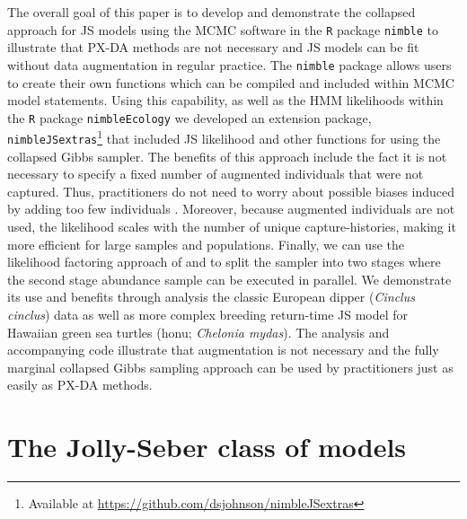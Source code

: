 \documentclass[12pt]{article}
\begin{document}
The overall goal of this paper is to develop and demonstrate the collapsed approach for JS models using the MCMC software in the {\tt R} package \verb|nimble| \citep{Valpine:2017vg} to illustrate that PX-DA methods are not necessary and JS models can be fit without data augmentation in regular practice. The \verb|nimble| package allows users to create their own functions which can be compiled and included within MCMC model statements. Using this capability, as well as the HMM likelihoods within the {\tt R} package {\tt nimbleEcology} \citep{GoldsteinEtAl2024a} we developed an extension package, {\tt nimbleJSextras}\footnote{Available at \url{https://github.com/dsjohnson/nimbleJSextras}} that included JS likelihood and other functions for using the collapsed Gibbs sampler. The benefits of this approach include the fact it is not necessary to specify a fixed number of augmented individuals that were not captured. Thus, practitioners do not need to worry about possible biases induced by adding too few individuals \citep{link2013cautionary}. Moreover, because augmented individuals are not used, the likelihood scales with the number of unique capture-histories, making it more efficient for large samples and populations. Finally, we can use the likelihood factoring approach of \cite{king2015capture} and \cite{Hooten:2023aa} to split the sampler into two stages where the second stage abundance sample can be executed in parallel. We demonstrate its use and benefits through analysis the classic European dipper ({\it Cinclus cinclus}) data as well as more complex breeding return-time JS model for Hawaiian green sea turtles (honu; {\it Chelonia mydas}). The analysis and accompanying code illustrate that augmentation is not necessary and the fully marginal collapsed Gibbs sampling approach can be used by practitioners just as easily as PX-DA methods. 


\section{The Jolly-Seber class of models}

\end{document}
